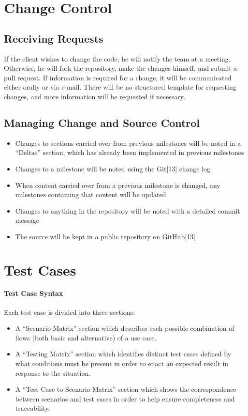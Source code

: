 \documentclass{article}
\begin{document}
\section{Change Control}

\subsection{Receiving Requests}
If the client wishes to change the code, he will notify the team at a meeting.  Otherwise, he will fork the repository, make the changes himself, and submit a pull request.  If information is required for a change, it will be communicated either orally or via e-mail.  There will be no structured template for requesting changes, and more information will be requested if necessary.

\subsection{Managing Change and Source Control}
\begin{itemize}
\item Changes to sections carried over from previous milestones will be noted in a ``Deltas'' section, which has already been implemented in previous milestones
\item Changes to a milestone will be noted using the Git[13] change log
\item When content carried over from a previous milestone is changed, any milestones containing that content will be updated
\item Changes to anything in the repository will be noted with a detailed commit message
\item The source will be kept in a public repository on GitHub[13]
\end{itemize}

\section{Test Cases}
\label{test_case}

\paragraph{Test Case Syntax}
Each test case is divided into three sections:
\begin{itemize}
\item A ``Scenario Matrix'' section which describes each possible combination of flows (both basic and alternative) of a use case.
\item A ``Testing Matrix'' section which identifies distinct test cases defined by what conditions must be present in order to enact an expected result in response to the situation.
\item A ``Test Case to Scenario Matrix'' section which shows the correspondence between scenarios and test cases in order to help ensure completeness and traceability.
\end{itemize}
\end{document}
